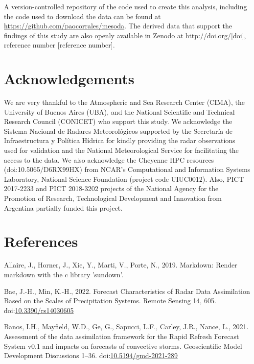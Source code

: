 \documentclass[final,5p,times,twocolumn,authoryear]{elsarticle} %
\begin{document}
A version-controlled repository of the code used to create this analysis, including the code used to download the data can be found at \url{https://github.com/paocorrales/mesoda}. The derived data that support the findings of this study are also openly available in Zenodo at http://doi.org/{[}doi{]}, reference number {[}reference number{]}.

\hypertarget{acknowledgements}{%
\section*{Acknowledgements}\label{acknowledgements}}

We are very thankful to the Atmospheric and Sea Research Center (CIMA), the University of Buenos Aires (UBA), and the National Scientific and Technical Research Council (CONICET) who support this study. We acknowledge the Sistema Nacional de Radares Meteorológicos supported by the Secretaría de Infraestructura y Política Hídrica for kindly providing the radar observations used for validation and the National Meteorological Service for facilitating the access to the data. We also acknowledge the Cheyenne HPC resources (doi:10.5065/D6RX99HX) from NCAR's Computational and Information Systems Laboratory, National Science Foundation (project code UIUC0012). Also, PICT 2017-2233 and PICT 2018-3202 projects of the National Agency for the Promotion of Research, Technological Development and Innovation from Argentina partially funded this project.

\hypertarget{references}{%
\section*{References}\label{references}}

\hypertarget{refs}{}
\leavevmode\hypertarget{ref-allaire2019}{}%
Allaire, J., Horner, J., Xie, Y., Marti, V., Porte, N., 2019. Markdown: Render markdown with the c library 'sundown'.

\leavevmode\hypertarget{ref-bae2022}{}%
Bae, J.-H., Min, K.-H., 2022. Forecast Characteristics of Radar Data Assimilation Based on the Scales of Precipitation Systems. Remote Sensing 14, 605. doi:\href{https://doi.org/10.3390/rs14030605}{10.3390/rs14030605}

\leavevmode\hypertarget{ref-banos2021}{}%
Banos, I.H., Mayfield, W.D., Ge, G., Sapucci, L.F., Carley, J.R., Nance, L., 2021. Assessment of the data assimilation framework for the Rapid Refresh Forecast System v0.1 and impacts on forecasts of convective storms. Geoscientific Model Development Discussions 1--36. doi:\href{https://doi.org/10.5194/gmd-2021-289}{10.5194/gmd-2021-289}
\end{document}
